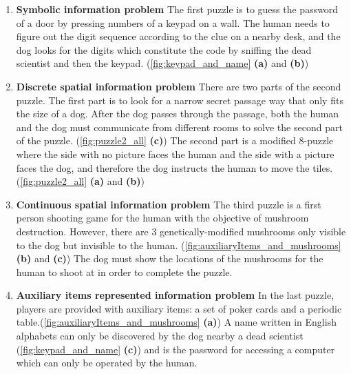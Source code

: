 \documentclass{sigchi}
\begin{document}
\begin{enumerate}

\item \textbf{Symbolic information problem}\newline
The first puzzle is to guess the password of a door by pressing numbers of a keypad on a wall. The human needs to figure out the digit sequence according to the clue on a nearby desk, and the dog looks for the digits which constitute the code by sniffing the dead scientist and then the keypad. (\autoref{fig:keypad_and_name} \textbf{(a)} and \textbf{(b)})

\item \textbf{Discrete spatial information problem}\newline
There are two parts of the second puzzle.
The first part is to look for a narrow secret passage way that only fits the size of a dog.
After the dog passes through the passage, both the human and the dog must communicate from different rooms to solve the second part of the puzzle. (\autoref{fig:puzzle2_all} \textbf{(c)})
The second part is a modified 8-puzzle where the side with no picture faces the human and the side with a picture faces the dog, and therefore the dog instructs the human to move the tiles.  (\autoref{fig:puzzle2_all} \textbf{(a)} and \textbf{(b)})

\item \textbf{Continuous spatial information problem}\newline
The third puzzle is a first person shooting game for the human with the objective of mushroom destruction.
However, there are 3 genetically-modified mushrooms only visible to the dog but invisible to the human. (\autoref{fig:auxiliaryItems_and_mushrooms} \textbf{(b)} and \textbf{(c)})
The dog must show the locations of the mushrooms for the human to shoot at in order to complete the puzzle.

\item \textbf{Auxiliary items represented information problem}\newline
In the last puzzle, players are provided with auxiliary items: a set of poker cards and a periodic table.(\autoref{fig:auxiliaryItems_and_mushrooms} \textbf{(a)}) A name written in English alphabets can only be discovered by the dog nearby a dead scientist (\autoref{fig:keypad_and_name} \textbf{(c)}) and is the password for accessing a computer which can only be operated by the human. 

\end{enumerate}
\end{document}
